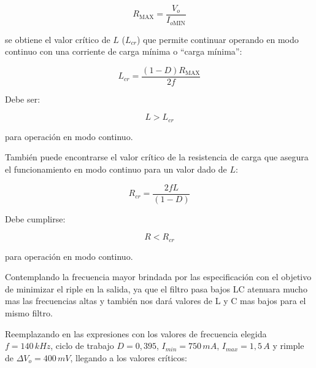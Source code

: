 \documentclass[]{article}
\begin{document}
	\begin{equation}
		R_{\text{MAX}} = \frac{V_o}{I_{o\text{MIN}}}
	\end{equation}
	
	se obtiene el valor crítico de \(L\) (\(L_{cr}\)) que permite continuar operando en modo continuo con una corriente de carga mínima o “carga mínima”:
	
	\begin{equation}
		L_{cr} = \frac{(1-D)R_{\text{MAX}}}{2f}
	\end{equation}
	
	Debe ser:
	
	\begin{equation}
		L > L_{cr}
	\end{equation}
	
	para operación en modo continuo.
	
	También puede encontrarse el valor crítico de la resistencia de carga que asegura el funcionamiento en modo continuo para un valor dado de \(L\):
	
	\begin{equation}
		R_{cr} = \frac{2fL}{(1-D)}
	\end{equation}
	
	Debe cumplirse:
	
	\begin{equation}
		R < R_{cr}
	\end{equation}
	
	para operación en modo continuo.
	
	Contemplando la frecuencia mayor brindada por las especificación con el objetivo de minimizar el riple en la salida, ya que el filtro pasa bajos LC atenuara mucho mas las frecuencias altas y también nos dará valores de L y C mas bajos para el mismo filtro.
	
	Reemplazando en las expresiones con los valores de frecuencia elegida $f = 140 \, kHz$, ciclo de trabajo $D = 0,395$, $I_{min} = 750 \, mA$, $I_{max} = 1,5 \,A$ y rimple de $\Delta V_o = 400 \, mV$, llegando a los valores críticos: 
	
\end{document}
